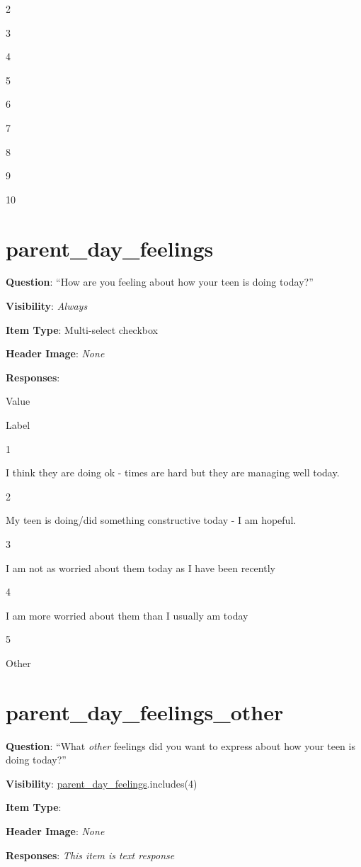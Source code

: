 \documentclass[]{book}
\begin{document}
2

3

4

5

6

7

8

9

10

\hypertarget{parent_day_feelings}{%
\section{parent\_day\_feelings}\label{parent_day_feelings}}

\textbf{Question}: ``How are you feeling about how your teen is doing today?''

\textbf{Visibility}: \emph{Always}

\textbf{Item Type}: Multi-select checkbox

\textbf{Header Image}: \emph{None}

\textbf{Responses}:

Value

Label

1

I think they are doing ok - times are hard but they are managing well today.

2

My teen is doing/did something constructive today - I am hopeful.

3

I am not as worried about them today as I have been recently

4

I am more worried about them than I usually am today

5

Other

\hypertarget{parent_day_feelings_other}{%
\section{parent\_day\_feelings\_other}\label{parent_day_feelings_other}}

\textbf{Question}: ``What \emph{other} feelings did you want to express about how your teen is doing today?''

\textbf{Visibility}: \protect\hyperlink{parent_day_feelings}{parent\_day\_feelings}.includes(4)

\textbf{Item Type}:

\textbf{Header Image}: \emph{None}

\textbf{Responses}: \emph{This item is text response}


\end{document}
